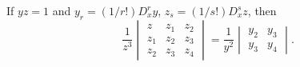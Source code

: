 If $yz = 1$ and $y_{r} = (1/r!) D_{x}^{r}y$, $z_{s} = (1/s!) D_{x}^{s}z$, then
\[
\frac{1}{z^{3}}
\begin{vmatrix}
z    & z_{1}& z_{2}\\
z_{1}& z_{2}& z_{3}\\
z_{2}& z_{3}& z_{4}
\end{vmatrix}
= \frac{1}{y^{2}}
\begin{vmatrix}
y_{2}& y_{3}\\
y_{3}& y_{4}
\end{vmatrix}.
\]

